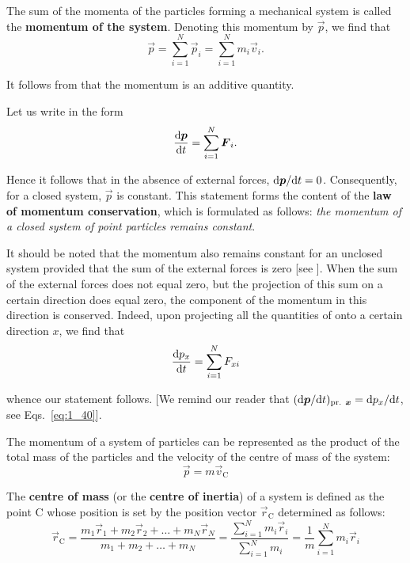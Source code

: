 The sum of the momenta of the particles forming a mechanical system is called the \textbf{momentum of the system}. Denoting this momentum by $\vec{p}$, we find that
\begin{equation}\label{eq:3_87}
\vec{p} = \sum_{i=1}^{N} \vec{p}_i = \sum_{i=1}^{N} m_i\vec{v}_i.
\end{equation}

\noindent
It follows from  that the momentum is an additive quantity.

Let us write  in the form
\begin{equation}\label{eq:3_88}
\frac{\mathrm{d}\boldsymbol{p}}{\mathrm{d} t} = \sum_{i=1}^{N} \boldsymbol{F}_i.
\end{equation}

\noindent
Hence it follows that in the absence of external forces, $\mathrm{d}\boldsymbol{p}/\mathrm{d} t=0$. Consequently, for a closed system, $\vec{p}$ is constant. This statement forms the content of the \textbf{law of momentum conservation}, which is formulated as follows: \textit{the momentum of a closed system of point particles remains constant}.

It should be noted that the momentum also remains constant for an unclosed system provided that the sum of the external forces is zero [see ]. When the sum of the external forces does not equal zero, but the projection of this sum on a certain direction does equal zero, the component of the momentum in this direction is conserved. Indeed, upon projecting all the quantities of  onto a certain direction $x$, we find that
\begin{equation}\label{eq:3_89}
\frac{\mathrm{d} p_x}{\mathrm{d} t} = \sum_{i=1}^{N} F_{xi}
\end{equation}

\noindent
whence our statement follows. [We remind our reader that $(\mathrm{d}\boldsymbol{p}/\mathrm{d} t)_{\text{pr. }\boldsymbol{x}}=\mathrm{d} p_x/\mathrm{d} t$, see Eqs.~\eqref{eq:1_40}].

The momentum of a system of particles can be represented as the product of the total mass of the particles and the velocity of the centre of mass of the system:
\begin{equation}\label{eq:3_90}
\vec{p} = m\vec{v}_{\text{C}}
\end{equation}

The \textbf{centre of mass} (or the \textbf{centre of inertia}) of a system is defined as the point C whose position is set by the position vector $\vec{r}_{\text{C}}$ determined as follows:
\begin{equation}\label{eq:3_91}
\vec{r}_{\text{C}} = \frac{m_1\vec{r}_1+m_2\vec{r}_2+\ldots+m_N\vec{r}_N}{m_1+m_2+\ldots+m_N} = \frac{\sum_{i=1}^N m_i\vec{r}_i}{\sum_{i=1}^N m_i} = \frac{1}{m} \sum_{i=1}^N m_i\vec{r}_i
\end{equation}


